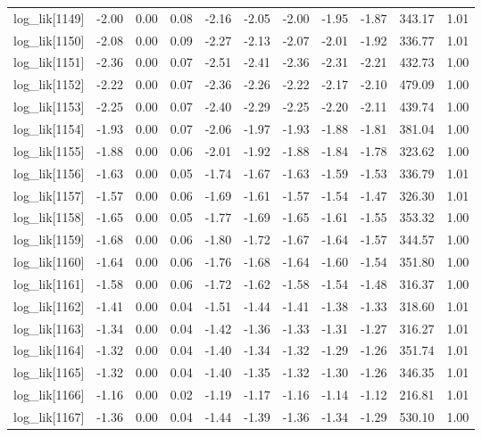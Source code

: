\begin{table}[ht]
\begin{tabular}{rrrrrrrrrrr}
  log\_lik[1149] & -2.00 & 0.00 & 0.08 & -2.16 & -2.05 & -2.00 & -1.95 & -1.87 & 343.17 & 1.01 \\ 
  log\_lik[1150] & -2.08 & 0.00 & 0.09 & -2.27 & -2.13 & -2.07 & -2.01 & -1.92 & 336.77 & 1.01 \\ 
  log\_lik[1151] & -2.36 & 0.00 & 0.07 & -2.51 & -2.41 & -2.36 & -2.31 & -2.21 & 432.73 & 1.00 \\ 
  log\_lik[1152] & -2.22 & 0.00 & 0.07 & -2.36 & -2.26 & -2.22 & -2.17 & -2.10 & 479.09 & 1.00 \\ 
  log\_lik[1153] & -2.25 & 0.00 & 0.07 & -2.40 & -2.29 & -2.25 & -2.20 & -2.11 & 439.74 & 1.00 \\ 
  log\_lik[1154] & -1.93 & 0.00 & 0.07 & -2.06 & -1.97 & -1.93 & -1.88 & -1.81 & 381.04 & 1.00 \\ 
  log\_lik[1155] & -1.88 & 0.00 & 0.06 & -2.01 & -1.92 & -1.88 & -1.84 & -1.78 & 323.62 & 1.00 \\ 
  log\_lik[1156] & -1.63 & 0.00 & 0.05 & -1.74 & -1.67 & -1.63 & -1.59 & -1.53 & 336.79 & 1.01 \\ 
  log\_lik[1157] & -1.57 & 0.00 & 0.06 & -1.69 & -1.61 & -1.57 & -1.54 & -1.47 & 326.30 & 1.01 \\ 
  log\_lik[1158] & -1.65 & 0.00 & 0.05 & -1.77 & -1.69 & -1.65 & -1.61 & -1.55 & 353.32 & 1.00 \\ 
  log\_lik[1159] & -1.68 & 0.00 & 0.06 & -1.80 & -1.72 & -1.67 & -1.64 & -1.57 & 344.57 & 1.00 \\ 
  log\_lik[1160] & -1.64 & 0.00 & 0.06 & -1.76 & -1.68 & -1.64 & -1.60 & -1.54 & 351.80 & 1.00 \\ 
  log\_lik[1161] & -1.58 & 0.00 & 0.06 & -1.72 & -1.62 & -1.58 & -1.54 & -1.48 & 316.37 & 1.00 \\ 
  log\_lik[1162] & -1.41 & 0.00 & 0.04 & -1.51 & -1.44 & -1.41 & -1.38 & -1.33 & 318.60 & 1.01 \\ 
  log\_lik[1163] & -1.34 & 0.00 & 0.04 & -1.42 & -1.36 & -1.33 & -1.31 & -1.27 & 316.27 & 1.01 \\ 
  log\_lik[1164] & -1.32 & 0.00 & 0.04 & -1.40 & -1.34 & -1.32 & -1.29 & -1.26 & 351.74 & 1.01 \\ 
  log\_lik[1165] & -1.32 & 0.00 & 0.04 & -1.40 & -1.35 & -1.32 & -1.30 & -1.26 & 346.35 & 1.01 \\ 
  log\_lik[1166] & -1.16 & 0.00 & 0.02 & -1.19 & -1.17 & -1.16 & -1.14 & -1.12 & 216.81 & 1.01 \\ 
  log\_lik[1167] & -1.36 & 0.00 & 0.04 & -1.44 & -1.39 & -1.36 & -1.34 & -1.29 & 530.10 & 1.00 \\ 

\end{tabular}
\end{table}
